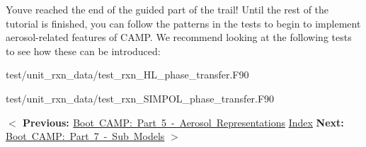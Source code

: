 You\textquotesingle{}ve reached the end of the guided part of the trail! Until the rest of the tutorial is finished, you can follow the patterns in the tests to begin to implement aerosol-\/related features of CAMP. We recommend looking at the following tests to see how these can be introduced\+:


\begin{DoxyItemize}
\item {\ttfamily test/unit\+\_\+rxn\+\_\+data/test\+\_\+rxn\+\_\+\+HL\+\_\+phase\+\_\+transfer.\+F90}
\item {\ttfamily test/unit\+\_\+rxn\+\_\+data/test\+\_\+rxn\+\_\+\+SIMPOL\+\_\+phase\+\_\+transfer.\+F90}
\end{DoxyItemize}

 {\bfseries{ \texorpdfstring{$<$}{<} Previous\+: }} \mbox{\hyperlink{camp_tutorial_part_5}{Boot CAMP\+: Part 5 -\/ Aerosol Representations}}  \mbox{\hyperlink{camp_tutorial}{Index}}  {\bfseries{ Next\+: }} \mbox{\hyperlink{camp_tutorial_part_7}{Boot CAMP\+: Part 7 -\/ Sub Models}} {\bfseries{ \texorpdfstring{$>$}{>} }} 